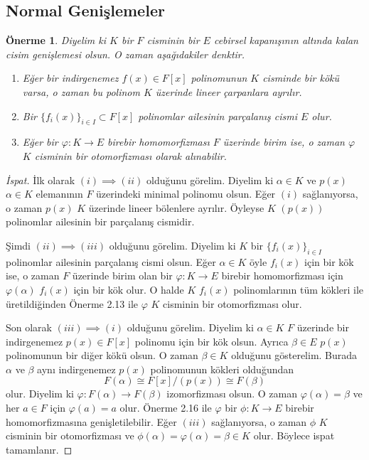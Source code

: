 \documentclass[draft]{article}
\newtheorem{prop}[thm]{Önerme}
\theoremstyle{definition}
\theoremstyle{remark}
\begin{document}
    	\subsection{Normal Genişlemeler}
    	
    	    \begin{prop}
    	        Diyelim ki $K$ bir $F$ cisminin bir $E$ cebirsel kapanışının altında kalan cisim genişlemesi olsun. O zaman aşağıdakiler denktir.
    	        \begin{enumerate}
				\renewcommand{\labelenumi}{(\roman{enumi})}
				    \item Eğer bir indirgenemez $f(x) \in F[x]$ polinomunun $K$ cisminde bir kökü varsa, o zaman bu polinom $K$ üzerinde lineer çarpanlara ayrılır.
				    \item Bir $\{f_i(x)\}_{i \in I} \subset F[x]$ polinomlar ailesinin parçalanış cismi $E$ olur.
				    \item Eğer bir $\varphi : K \to E$ birebir homomorfizması $F$ üzerinde birim ise, o zaman $\varphi$ $K$ cisminin bir otomorfizması olarak alınabilir.
				\end{enumerate}
    	    \end{prop}
    	    
    	    \begin{proof}[İspat]
    	        İlk olarak $(i) \implies (ii)$ olduğunu görelim. Diyelim ki $\alpha \in K$ ve $p(x)$ $\alpha \in K$ elemanının $F$ üzerindeki minimal polinomu olsun. Eğer $(i)$ sağlanıyorsa, o zaman $p(x)$ $K$ üzerinde lineer bölenlere ayrılır. Öyleyse $K$ $(p(x))$ polinomlar ailesinin bir parçalanış cismidir.\par
    	        Şimdi $(ii) \implies (iii)$ olduğunu görelim. Diyelim ki $K$ bir $\{f_i(x)\}_{i \in I}$ polinomlar ailesinin parçalanış cismi olsun. Eğer $\alpha \in K$ öyle $f_i(x)$ için bir kök ise, o zaman $F$ üzerinde birim olan bir $\varphi: K \to E$ birebir homomorfizması için $\varphi(\alpha)$ $f_i(x)$ için bir kök olur. O halde $K$ $f_i(x)$ polinomlarının tüm kökleri ile üretildiğinden Önerme 2.13 ile $\varphi$ $K$ cisminin bir otomorfizması olur.\par
    	        Son olarak $(iii) \implies (i)$ olduğunu görelim. Diyelim ki $\alpha \in K$ $F$ üzerinde bir indirgenemez $p(x) \in F[x]$ polinomu için bir kök olsun. Ayrıca $\beta \in E$ $p(x)$ polinomunun bir diğer kökü olsun. O zaman $\beta \in K$ olduğunu gösterelim. Burada $\alpha$ ve $\beta$ aynı indirgenemez $p(x)$ polinomunun kökleri olduğundan
    	        \begin{equation*}
    	            F(\alpha) \cong F[x]/(p(x)) \cong F(\beta)
    	        \end{equation*}
    	        olur. Diyelim ki $\varphi: F(\alpha) \to F(\beta)$ izomorfizması olsun. O zaman $\varphi(\alpha) = \beta$ ve her $a \in F$ için $\varphi(a) = a$ olur. Önerme 2.16 ile $\varphi$ bir $\phi: K \to E$ birebir homomorfizmasına genişletilebilir. Eğer $(iii)$ sağlanıyorsa, o zaman $\phi$ $K$ cisminin bir otomorfizması ve $\phi(\alpha) = \varphi(\alpha) = \beta \in K$ olur. Böylece ispat tamamlanır.
    	    \end{proof}
    	    
\end{document}
